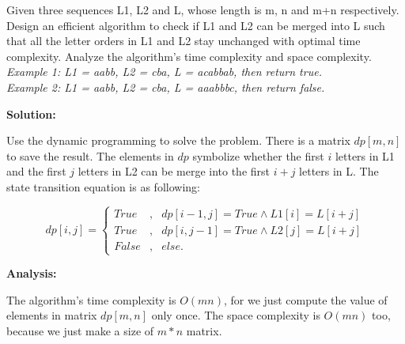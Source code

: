 \problem{}
Given three sequences L1, L2 and L, whose length is m, n and m+n respectively. Design an efficient algorithm to check if L1 and L2 can be merged into L such that all the letter orders in L1 and L2 stay unchanged with optimal time complexity. Analyze the algorithm's time complexity and space complexity.\\
\textit{Example 1: L1 = aabb, L2 = cba, L = acabbab, then return true.}\\
\textit{Example 2: L1 = aabb, L2 = cba, L = aaabbbc, then return false.}

\textbf{Solution:}

Use the dynamic programming to solve the problem. There is a matrix $dp[m,n]$ to save the result. The elements in $dp$ symbolize whether the first $i$ letters in L1 and the first $j$ letters in L2 can be merge into the first $i+j$ letters in L. The state transition equation is as following:

\begin{equation}
	\label{eq6}
	dp[i,j]=\left\{
	\begin{aligned}
		True & , & dp[i-1,j] = True\wedge L1[i] = L[i+j] \\
		True & , & dp[i,j-1] = True\wedge L2[j] = L[i+j] \\
		False & , & else.
	\end{aligned}
	\right.
\end{equation}

\textbf{Analysis:}

The algorithm's time complexity is $O(mn)$, for we just compute the value of elements in matrix $dp[m,n]$ only once. The space complexity is $O(mn)$ too, because we just make a size of $m*n$ matrix. 

